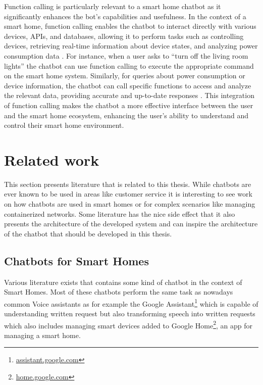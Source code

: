 Function calling is particularly relevant to a smart home chatbot as it significantly enhances the bot's capabilities and usefulness. In the context of a smart home, function calling enables the chatbot to interact directly with various devices, APIs, and databases, allowing it to perform tasks such as controlling devices, retrieving real-time information about device states, and analyzing power consumption data \cite{google2024function}. For instance, when a user asks to ``turn off the living room lights'' the chatbot can use function calling to execute the appropriate command on the smart home system. Similarly, for queries about power consumption or device information, the chatbot can call specific functions to access and analyze the relevant data, providing accurate and up-to-date responses \cite{mistral2024function, openai2024function-article}. This integration of function calling makes the chatbot a more effective interface between the user and the smart home ecosystem, enhancing the user's ability to understand and control their smart home environment.

\newpage
\section{Related work}
This section presents literature that is related to this thesis.
While chatbots are ever known to be used in areas like customer service it is interesting to see work on how chatbots are used in smart homes or for complex scenarios like managing containerized networks.
Some literature has the nice side effect that it also presents the architecture of the developed system and can inspire the architecture of the chatbot that should be developed in this thesis.

\subsection{Chatbots for Smart Homes}
Various literature exists that contains some kind of chatbot in the context of Smart Homes.
Most of these chatbots perform the same task as nowadays common Voice assistants as for example the Google Assistant\footnote{\href{https://assistant.google.com/}{assistant.google.com}} which is capable of understanding written request but also transforming speech into written requests which also includes managing smart devices added to Google Home\footnote{\href{https://home.google.com/intl/de_de/the-latest/}{home.google.com}}, an app for managing a smart home.


